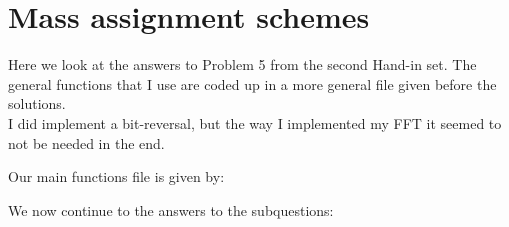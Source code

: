 \section{Mass assignment schemes}

Here we look at the answers to Problem 5 from the second Hand-in set. The general functions that I use are coded up in a more general file given before the solutions.\\

I did implement a bit-reversal, but the way I implemented my FFT it seemed to not be needed in the end.

Our main functions file is given by:


We now continue to the answers to the subquestions:









